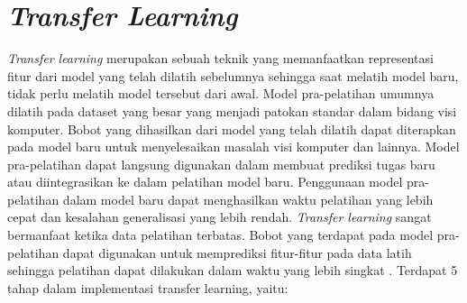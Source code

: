 \section{\textit{Transfer Learning}}
\textit{Transfer learning} merupakan sebuah teknik yang memanfaatkan representasi fitur dari model yang telah dilatih sebelumnya sehingga saat melatih model baru, tidak perlu melatih model tersebut dari awal. Model pra-pelatihan umumnya dilatih pada dataset yang besar yang menjadi patokan standar dalam bidang visi komputer. Bobot yang dihasilkan dari model yang telah dilatih dapat diterapkan pada model baru untuk menyelesaikan masalah visi komputer dan lainnya. Model pra-pelatihan dapat langsung digunakan dalam membuat prediksi tugas baru atau diintegrasikan ke dalam pelatihan model baru. Penggunaan model pra-pelatihan dalam model baru dapat menghasilkan waktu pelatihan yang lebih cepat dan kesalahan generalisasi yang lebih rendah. \textit{Transfer learning} sangat bermanfaat ketika data pelatihan terbatas. Bobot yang terdapat pada model pra-pelatihan dapat digunakan untuk memprediksi fitur-fitur pada data latih sehingga pelatihan dapat dilakukan dalam waktu yang lebih singkat \cite{zhuang2020}. Terdapat 5 tahap dalam implementasi transfer learning, yaitu:
